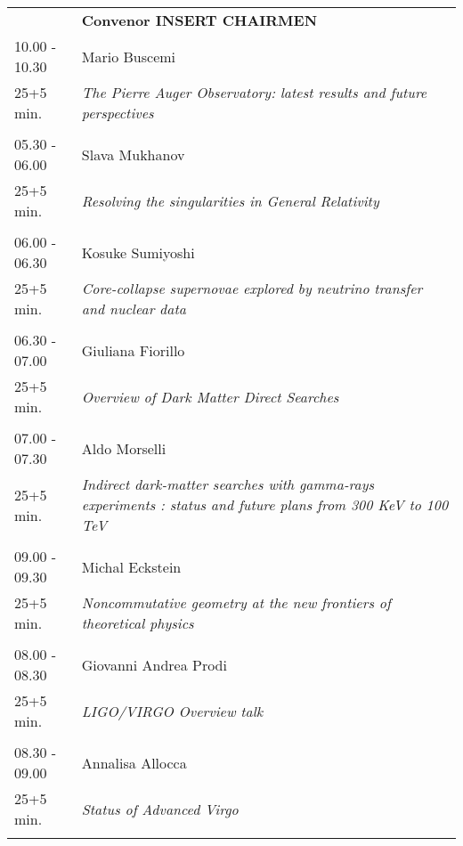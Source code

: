\begin{longtable}{p{3cm}p{13cm}}
&\hfill {\bf Convenor INSERT CHAIRMEN }\\ 
10.00 - 10.30 & Mario Buscemi\\ 
25+5 min. & {\it The Pierre Auger Observatory: latest results and future perspectives}\\ 
 & \\ 
05.30 - 06.00 & Slava Mukhanov\\ 
25+5 min. & {\it Resolving the singularities in General Relativity}\\ 
 & \\ 
06.00 - 06.30 & Kosuke Sumiyoshi\\ 
25+5 min. & {\it Core-collapse supernovae explored by neutrino transfer and nuclear data}\\ 
 & \\ 
06.30 - 07.00 & Giuliana Fiorillo\\ 
25+5 min. & {\it Overview of Dark Matter Direct Searches}\\ 
 & \\ 
07.00 - 07.30 & Aldo Morselli\\ 
25+5 min. & {\it Indirect dark-matter searches with gamma-rays experiments : status and future plans from 300 KeV to 100 TeV}\\ 
 & \\ 
09.00 - 09.30 & Michal Eckstein\\ 
25+5 min. & {\it Noncommutative geometry at the new frontiers of theoretical physics}\\ 
 & \\ 
08.00 - 08.30 & Giovanni Andrea Prodi\\ 
25+5 min. & {\it LIGO/VIRGO Overview talk}\\ 
 & \\ 
08.30 - 09.00 & Annalisa Allocca\\ 
25+5 min. & {\it Status of Advanced Virgo}\\ 
 & \\ 
\end{longtable}


